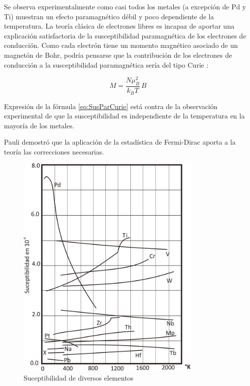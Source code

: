 Se observa experimentalmente como casi todos los metales (a excepción de Pd y Ti) muestran un efecto paramagnético débil y poco dependiente de la temperatura. La teoría clásica de electrones libres es incapaz de aportar una explicación satisfactoria de la susceptibilidad paramagnética de los electrones de conducción. Como cada electrón tiene un momento magnético asociado de un magnetón de Bohr, podría pensarse que la contribución de los electrones de conducción a la susceptibilidad paramagnética sería del tipo Curie :

\begin{equation}
	M=\frac{N\mu_B^{2}}{k_{B}T}\,B
\label{eq:SusParCurie}
\end{equation}

Expresión de la fórmula \ref{eq:SusParCurie} está contra de la observación experimental de que la susceptibilidad es independiente de la temperatura en la mayoría de los metales.

Pauli demostró que la aplicación de la estadística de Fermi-Dirac aporta a la teoría las correcciones necesarias.

\begin{figure}[H]
    \centering
    \includegraphics[width=0.8\textwidth]{./Figures/Suceptibilidad}
	\caption{Suceptibilidad de diversos elementos}
	\label{fig:Suceptibilidad}
\end{figure}

